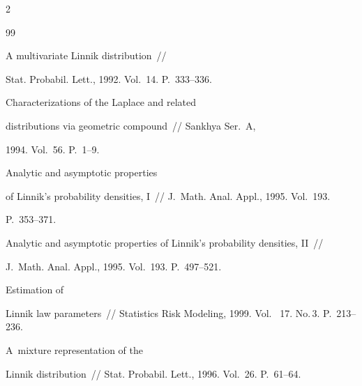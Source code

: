 \begin{multicols}{2}
{{\begin{thebibliography}{99}


 A multivariate Linnik distribution~//


Stat.  Probabil. Lett., 1992. Vol.~14. P.~333--336.







 Characterizations of the Laplace and related


distributions via geometric compound~// Sankhya Ser.~A, 


1994. Vol.~56. P.~1--9.







 Analytic and asymptotic properties 


of Linnik's probability densities, I~// J.~Math. Anal. Appl., 1995. Vol.~193. 


P.~353--371.









Analytic and asymptotic properties of Linnik's probability densities, II~// 


J.~Math. Anal.  Appl., 1995. Vol.~193. P.~497--521.







 Estimation of


Linnik law parameters~// Statistics Risk Modeling, 1999. Vol. ~17. No.\,3. P.~213--236.













 A~mixture representation of the


Linnik distribution~// Stat. Probabil. Lett., 1996. Vol.~26. P.~61--64.






\end{thebibliography}}}
\end{multicols}

